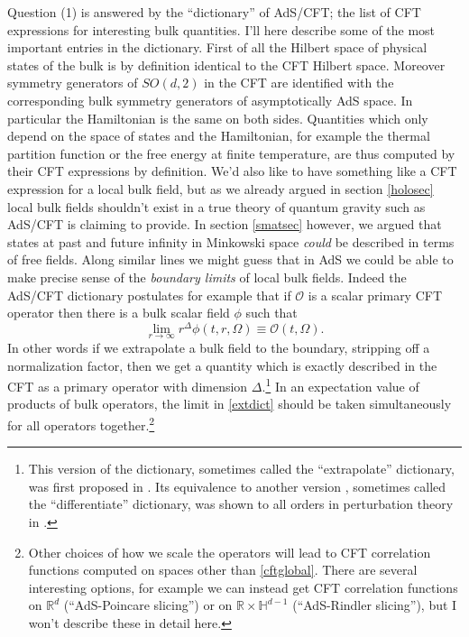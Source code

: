 \documentclass[12pt]{article}
\newcommand{\be}{\begin{equation}}
\newcommand{\ee}{\end{equation}}
\begin{document}
Question (1) is answered by the ``dictionary'' of AdS/CFT; the list of CFT expressions for interesting bulk quantities.  I'll here describe some of the most important entries in the dictionary.  First of all the Hilbert space of physical states of the bulk is by definition identical to the CFT Hilbert space.  Moreover symmetry generators of $SO(d,2)$ in the CFT are identified with the corresponding bulk symmetry generators of asymptotically AdS space.  In particular the Hamiltonian is the same on both sides.  Quantities which only depend on the space of states and the Hamiltonian, for example the thermal partition function or the free energy at finite temperature, are thus computed by their CFT expressions by definition.  We'd also like to have something like a CFT expression for a local bulk field, but as we already argued in section \ref{holosec} local bulk fields shouldn't exist in a true theory of quantum gravity such as AdS/CFT is claiming to provide.  In section \ref{smatsec} however, we argued that states at past and future infinity in Minkowski space \textit{could} be described in terms of free fields.  Along similar lines we might guess that in AdS we could be able to make precise sense of the \textit{boundary limits} of local bulk fields.  Indeed the AdS/CFT dictionary postulates for example that if $\mathcal{O}$ is a scalar primary CFT operator then there is a bulk scalar field $\phi$ such that 
\be\label{extdict}
\lim_{r\to\infty}r^{\Delta}\phi(t,r,\Omega)\equiv \mathcal{O}(t,\Omega).
\ee
In other words if we extrapolate a bulk field to the boundary, stripping off a normalization factor, then we get a quantity which is exactly described in the CFT as a primary operator with dimension $\Delta$.\footnote{This version of the dictionary, sometimes called the ``extrapolate'' dictionary, was first proposed in \cite{Banks:1998dd}.  Its equivalence to another version \cite{Witten:1998qj,Gubser:1998bc}, sometimes called the ``differentiate'' dictionary, was shown to all orders in perturbation theory in \cite{Harlow:2011ke}.}  In an expectation value of products of bulk operators, the limit in \ref{extdict} should be taken simultaneously for all operators together.\footnote{Other choices of how we scale the operators will lead to CFT correlation functions computed on spaces other than \eqref{cftglobal}.  There are several interesting options, for example we can instead get CFT correlation functions on $\mathbb{R}^d$ (``AdS-Poincare slicing'') or on $\mathbb{R}\times \mathbb{H}^{d-1}$ (``AdS-Rindler slicing''), but I won't describe these in detail here.}
\end{document}
